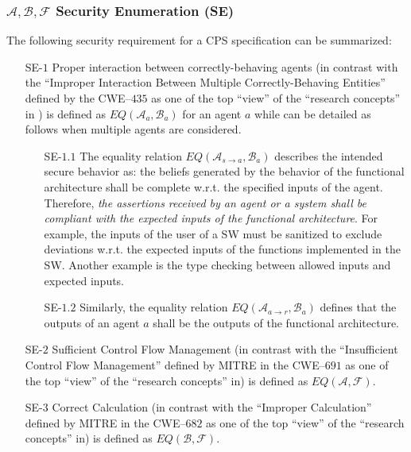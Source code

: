 \documentclass[conference]{IEEEtran}
\newcommand{\assertionRegion}{\mathcal{A}}
\newcommand{\beliefRegion}{\mathcal{B}}
\newcommand{\factRegion}{\mathcal{F}}
\newcommand{\abf}{\assertionRegion,\beliefRegion,\factRegion}
\newcommand{\eq}[2]{EQ(#1,#2)}
\begin{document}
\subsubsection{$\abf$ Security Enumeration (SE)} The following security
requirement for a CPS specification can be summarized:
\begin{enumerate}
	\item[SE-$1$] Proper interaction between correctly-behaving agents (in
		contrast with the ``Improper Interaction Between Multiple
		Correctly-Behaving Entities'' defined by the CWE--$435$ as one
		of the top ``view'' of the ``research concepts'' in
		\autocite{MITRE2020CWEresearch}) is defined as
		$\eq{\assertionRegion_a}{\beliefRegion_a}$ for an agent $a$
		while can be detailed as follows when multiple agents are
		considered.
	\begin{enumerate}
		\item[SE-$1.1$] The equality relation
			$\eq{\assertionRegion_{s\rightarrow
			a}}{\beliefRegion_a}$ describes the intended secure
			behavior as: the beliefs generated by the behavior of
			the functional architecture shall be complete w.r.t.
			the specified inputs of the agent. Therefore, \emph{the
			assertions received by an agent or a system shall be
			compliant with the expected inputs of the functional
			architecture}. For example, the inputs of the user of a
			SW must be sanitized to exclude deviations w.r.t. the
			expected inputs of the functions implemented in the SW.
			Another example is the type checking between allowed
			inputs and expected inputs.
		\item[SE-$1.2$] Similarly, the equality relation
			$\eq{\assertionRegion_{a\rightarrow
			r}}{\beliefRegion_a}$ defines that the outputs of an
			agent $a$ shall be the outputs of the functional
			architecture.
	\end{enumerate}
	\item[SE-$2$]Sufficient Control Flow Management (in contrast with
		the ``Insufficient Control Flow Management'' defined by MITRE
		in the CWE--$691$ as one of the top ``view'' of the ``research
		concepts'' in\autocite{MITRE2020CWEresearch}) is defined as
		$\eq{\assertionRegion}{\factRegion}$.
	\item[SE-$3$] Correct Calculation (in contrast with the ``Improper
		Calculation'' defined by MITRE in the CWE--$682$ as one of the
		top ``view'' of the ``research concepts''
		in\autocite{MITRE2020CWEresearch}) is defined as
		$\eq{\beliefRegion}{\factRegion}$.
\end{enumerate}
\end{document}
